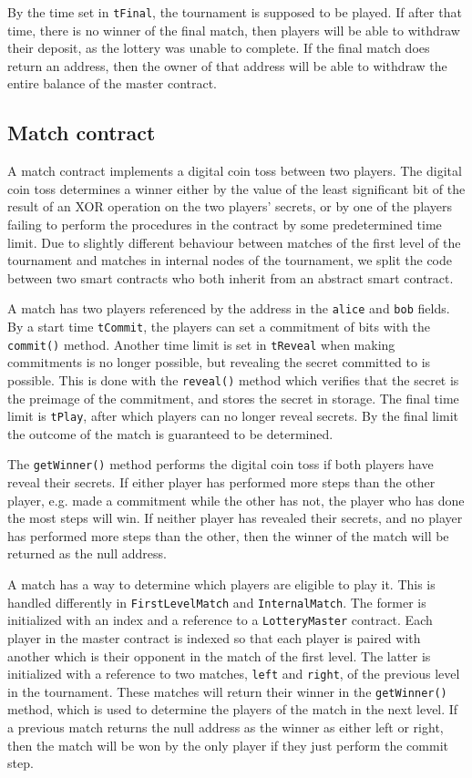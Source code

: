 By the time set in \texttt{tFinal}, the tournament is supposed to be played. If after that time, there is no winner of the final match, then players will be able to withdraw their deposit, as the lottery was unable to complete. If the final match does return an address, then the owner of that address will be able to withdraw the entire balance of the master contract.

\subsection{Match contract}
A match contract implements a digital coin toss between two players. The digital coin toss determines a winner either by the value of the least significant bit of the result of an XOR operation on the two players' secrets, or by one of the players failing to perform the procedures in the contract by some predetermined time limit.
Due to slightly different behaviour between matches of the first level of the tournament and matches in internal nodes of the tournament, we split the code between two smart contracts who both inherit from an abstract smart contract.

A match has two players referenced by the address in the \texttt{alice} and \texttt{bob} fields. By a start time \texttt{tCommit}, the players can set a commitment of bits with the \texttt{commit()} method. Another time limit is set in \texttt{tReveal} when making commitments is no longer possible, but revealing the secret committed to is possible. This is done with the \texttt{reveal()} method which verifies that the secret is the preimage of the commitment, and stores the secret in storage. The final time limit is \texttt{tPlay}, after which players can no longer reveal secrets. By the final limit the outcome of the match is guaranteed to be determined. 

The \texttt{getWinner()} method performs the digital coin toss if both players have reveal their secrets. If either player has performed more steps than the other player, e.g. made a commitment while the other has not, the player who has done the most steps will win. If neither player has revealed their secrets, and no player has performed more steps than the other, then the winner of the match will be returned as the null address.

A match has a way to determine which players are eligible to play it. This is handled differently in \texttt{FirstLevelMatch} and \texttt{InternalMatch}. The former is initialized with an index and a reference to a \texttt{LotteryMaster} contract. Each player in the master contract is indexed so that each player is paired with another which is their opponent in the match of the first level. The latter is initialized with a reference to two matches, \texttt{left} and \texttt{right}, of the previous level in the tournament. These matches will return their winner in the \texttt{getWinner()} method, which is used to determine the players of the match in the next level. If a previous match returns the null address as the winner as either left or right, then the match will be won by the only player if they just perform the commit step.

